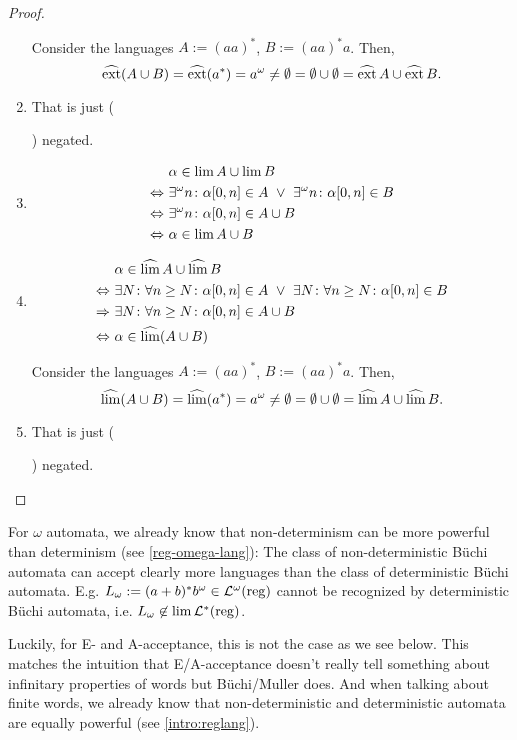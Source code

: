 \begin{lemma}
\begin{proof}
\begin{enumerate}
Consider the languages $A := (aa)^*$, $B := (aa)^*a$. Then,
\[ \operatorname{\widehat{ext}}(A \cup B) = \operatorname{\widehat{ext}}(a^*) = a^\omega \ne \emptyset = \emptyset \cup \emptyset = \operatorname{\widehat{ext}} A \cup \operatorname{\widehat{ext}} B . \]
\item That is just (\addtocounter{enumi}{-1}\addtocounter{enumi}{+1}) negated.
\item %
\begin{align*}
& \alpha \in \lim A \cup \lim B \\
\Leftrightarrow \ & \existsinf n \colon \alpha[0,n] \in A \ \vee \ \existsinf n \colon \alpha[0,n] \in B \\
\Leftrightarrow \ & \existsinf n \colon \alpha[0,n] \in A \cup B \\
\Leftrightarrow \ & \alpha \in \lim A \cup B
\end{align*}

\item %
\begin{align*}
& \alpha \in \dlim A \cup \dlim B \\
\Leftrightarrow \ & \exists N \colon \forall n \ge N \colon \alpha[0,n] \in A \ \vee \ 
\exists N \colon \forall n \ge N \colon \alpha[0,n] \in B \\
\Rightarrow \ & \exists N \colon \forall n \ge N \colon \alpha[0,n] \in A \cup B \\
\Leftrightarrow \ & \alpha \in \dlim (A \cup B)
\end{align*}

Consider the languages $A := (aa)^*$, $B := (aa)^*a$. Then,
\[ \operatorname{\widehat{lim}}(A \cup B) = \operatorname{\widehat{lim}}(a^*) = a^\omega \ne \emptyset = \emptyset \cup \emptyset = \operatorname{\widehat{lim}} A \cup \operatorname{\widehat{lim}} B . \]

\item That is just (\addtocounter{enumi}{-1}\addtocounter{enumi}{+1}) negated.
\end{enumerate}
\end{proof}
\end{lemma}

For $\omega$ automata, we already know that non-determinism can be more powerful than determinism (see \cref{reg-omega-lang}): The class of non-deterministic Büchi automata can accept clearly more languages than the class of deterministic Büchi automata. E.g. $L_\omega := (a+b)^* b^\omega \in \mathcal{L}^\omega(\textup{\textrm{reg}})$ cannot be recognized by deterministic Büchi automata, i.e. $L_\omega \not\in \lim \mathcal{L}^*(\textup{\textrm{reg}})$.

Luckily, for E- and A-acceptance, this is not the case as we see below. This matches the intuition that E/A-acceptance doesn't really tell something about infinitary properties of words but Büchi/Muller does. And when talking about finite words, we already know that non-deterministic and deterministic automata are equally powerful (see \cref{intro:reglang}).

